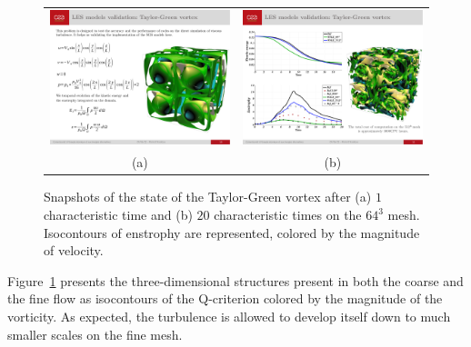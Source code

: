 \begin{figure}[ht!]
    \centering
    \begin{tabular}{cc}
        \includegraphics[width=0.45\linewidth]{chapter3_numerical_methods/pictures/TGV_coarse.pdf} &
        \includegraphics[width=0.45\linewidth]{chapter3_numerical_methods/pictures/TGV_fine.pdf} \\
        (a) & (b)
    \end{tabular}
    \caption{Snapshots of the state of the Taylor-Green vortex after (a) $1$ characteristic time and (b) $20$ characteristic times on the $64^3$ mesh.
    Isocontours of enstrophy are represented, colored by the magnitude of velocity.}
    \label{fig:TGV_view}
\end{figure}

Figure~\ref{fig:TGV_view} presents the three-dimensional structures present in both the coarse and the fine flow as isocontours of the Q-criterion colored by the magnitude of the vorticity.
As expected, the turbulence is allowed to develop itself down to much smaller scales on the fine mesh.

